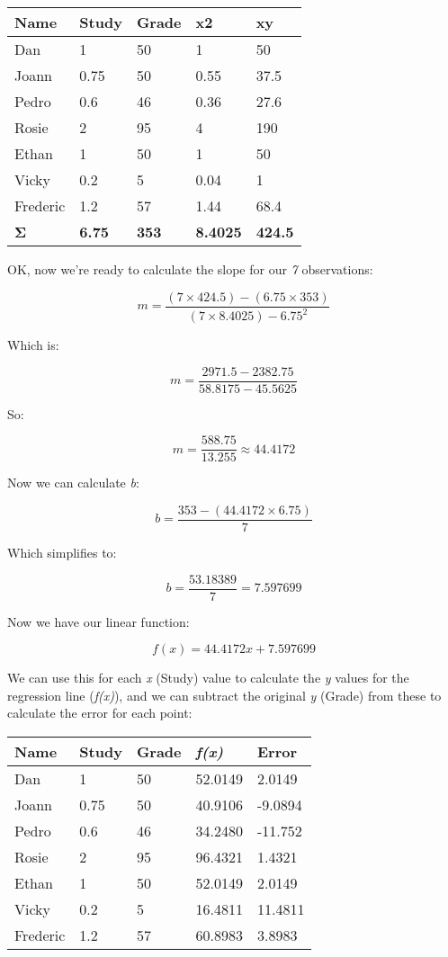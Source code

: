 \documentclass[11pt]{article}
\begin{document}
\begin{longtable}[c]{@{}lllll@{}}
\toprule
Name & Study & Grade & x2 & xy\tabularnewline
\midrule
\endhead
Dan & 1 & 50 & 1 & 50\tabularnewline
Joann & 0.75 & 50 & 0.55 & 37.5\tabularnewline
Pedro & 0.6 & 46 & 0.36 & 27.6\tabularnewline
Rosie & 2 & 95 & 4 & 190\tabularnewline
Ethan & 1 & 50 & 1 & 50\tabularnewline
Vicky & 0.2 & 5 & 0.04 & 1\tabularnewline
Frederic & 1.2 & 57 & 1.44 & 68.4\tabularnewline
\textbf{Σ} & \textbf{6.75} & \textbf{353} & \textbf{8.4025} &
\textbf{424.5}\tabularnewline
\bottomrule
\end{longtable}

OK, now we're ready to calculate the slope for our \emph{7}
observations:

\begin{equation}m = \frac{(7\times 424.5) - (6.75\times353)}{(7\times8.4025)-6.75^{2}}\end{equation}

Which is:

\begin{equation}m = \frac{2971.5 - 2382.75}{58.8175-45.5625}\end{equation}

So:

\begin{equation}m = \frac{588.75}{13.255} \approx 44.4172\end{equation}

Now we can calculate \emph{b}:

\begin{equation}b = \frac{353 - (44.4172\times6.75)}{7}\end{equation}

Which simplifies to:

\begin{equation}b = \frac{53.18389}{7} = 7.597699\end{equation}

Now we have our linear function:

\begin{equation}f(x) = 44.4172x + 7.597699\end{equation}

We can use this for each \emph{x} (Study) value to calculate the
\emph{y} values for the regression line (\emph{f(x)}), and we can
subtract the original \emph{y} (Grade) from these to calculate the error
for each point:

\begin{longtable}[c]{@{}lllll@{}}
\toprule
Name & Study & Grade & \emph{f(x)} & Error\tabularnewline
\midrule
\endhead
Dan & 1 & 50 & 52.0149 & 2.0149\tabularnewline
Joann & 0.75 & 50 & 40.9106 & -9.0894\tabularnewline
Pedro & 0.6 & 46 & 34.2480 & -11.752\tabularnewline
Rosie & 2 & 95 & 96.4321 & 1.4321\tabularnewline
Ethan & 1 & 50 & 52.0149 & 2.0149\tabularnewline
Vicky & 0.2 & 5 & 16.4811 & 11.4811\tabularnewline
Frederic & 1.2 & 57 & 60.8983 & 3.8983\tabularnewline
\bottomrule
\end{longtable}
\end{document}
